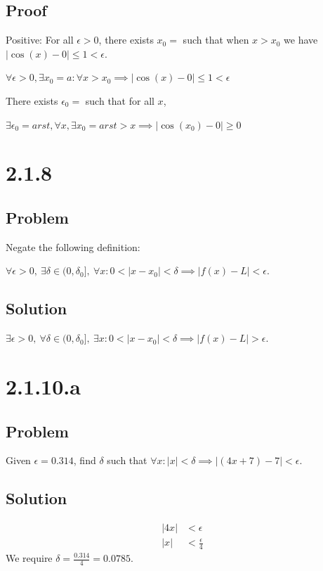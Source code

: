 \documentclass[12pt]{article}
\newcommand{\abs}  [1]{\left|       #1 \right|      }
\begin{document}
\subsection*{Proof}
Positive:
For all $\epsilon > 0$, there exists $x_0 = $ such that when $x > x_0$ we have $\abs{\cos(x) - 0} \leq 1 < \epsilon$.

$\forall \epsilon > 0, \exists x_0 = a : \forall x > x_0 \implies \abs{\cos(x) - 0} \leq 1 < \epsilon$

There exists $\epsilon_0 = $ such that for all $x$,

$\exists \epsilon_0 = arst, \forall x, \exists x_0 = arst > x \implies \abs{\cos(x_0) - 0} \geq 0$



\section*{2.1.8}

\subsection*{Problem}

Negate the following definition:

$\forall \epsilon > 0,\ \exists \delta \in (0, \delta_0],\ \forall x : 0 < \abs{x - x_0} < \delta \implies \abs{f(x) - L} < \epsilon$.

\subsection*{Solution}
$\exists \epsilon > 0,\ \forall \delta \in (0, \delta_0],\ \exists x : 0 < \abs{x - x_0} < \delta \implies \abs{f(x) - L} > \epsilon$.



\section*{2.1.10.a}

\subsection*{Problem}
Given $\epsilon = 0.314$, find $\delta$ such that $\forall x : \abs{x} < \delta \implies \abs{(4x + 7) - 7} < \epsilon$.

\subsection*{Solution}
\begin{align*}
    \abs{4x} &< \epsilon \\
    \abs{x} &< \frac{\epsilon}{4}
\end{align*}
We require $\delta = \frac{0.314}{4} = \boxed{0.0785}$.
\end{document}
